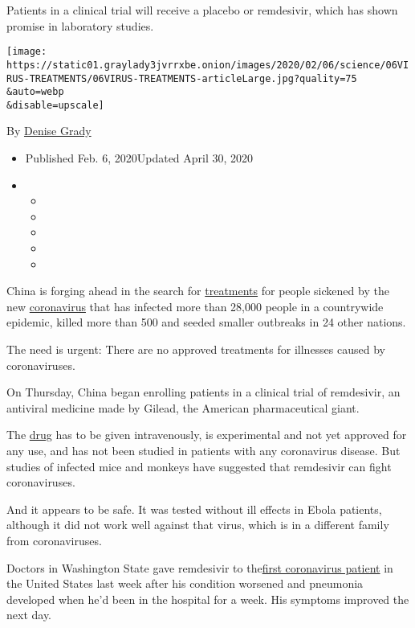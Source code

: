 Patients in a clinical trial will receive a placebo or remdesivir, which
has shown promise in laboratory studies.

\texttt{[image: https://static01.graylady3jvrrxbe.onion/images/2020/02/06/science/06VIRUS-TREATMENTS/06VIRUS-TREATMENTS-articleLarge.jpg?quality=75\\\&auto=webp\\\&disable=upscale]}

By \href{https://www.nytimes3xbfgragh.onion/by/denise-grady}{Denise
Grady}

\begin{itemize}
\item
  Published Feb. 6, 2020Updated April 30, 2020
\item
  \begin{itemize}
  \item
  \item
  \item
  \item
  \item
  \end{itemize}
\end{itemize}

China is forging ahead in the search for
\href{https://www.nytimes3xbfgragh.onion/2020/04/30/technology/coronavirus-treatment-benevolentai-baricitinib.html}{treatments}
for people sickened by the new
\href{https://www.nytimes3xbfgragh.onion/2020/04/30/health/coronavirus-antiviral-drugs.html}{coronavirus}
that has infected more than 28,000 people in a countrywide epidemic,
killed more than 500 and seeded smaller outbreaks in 24 other nations.

The need is urgent: There are no approved treatments for illnesses
caused by coronaviruses.

On Thursday, China began enrolling patients in a clinical trial of
remdesivir, an antiviral medicine made by Gilead, the American
pharmaceutical giant.

The
\href{https://www.nytimes3xbfgragh.onion/2020/04/30/health/coronavirus-antiviral-drugs.html}{drug}
has to be given intravenously, is experimental and not yet approved for
any use, and has not been studied in patients with any coronavirus
disease. But studies of infected mice and monkeys have suggested that
remdesivir can fight coronaviruses.

And it appears to be safe. It was tested without ill effects in Ebola
patients, although it did not work well against that virus, which is in
a different family from coronaviruses.

Doctors in Washington State gave remdesivir to
the\href{https://www.nytimes3xbfgragh.onion/2020/02/05/us/corona-virus-washington-state.html}{first
coronavirus patient} in the United States last week after his condition
worsened and pneumonia developed when he'd been in the hospital for a
week. His symptoms improved the next day.

